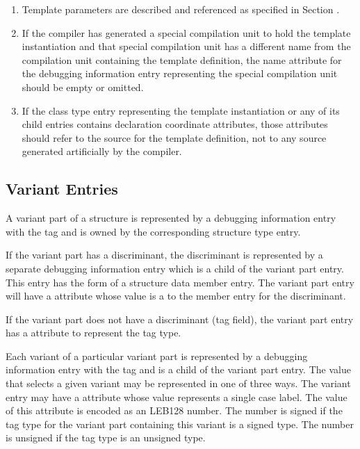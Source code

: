 \begin{enumerate}[1. ]
\item Template parameters are described and referenced as
specified in Section .

\item If the compiler has generated a special compilation unit to
hold the 
template instantiation and that special compilation
unit has a different name from the compilation unit containing
the template definition, the name attribute for the debugging
information entry representing the special compilation unit
should be empty or omitted.

\item If the class type entry representing the template
instantiation or any of its child entries contains declaration
coordinate attributes, those attributes should refer to
the source for the template definition, not to any source
generated artificially by the compiler.
\end{enumerate}


\subsection{Variant Entries}
\label{chap:variantentries}

A variant part of a structure is represented by a debugging
information entry with the 
tag \DWTAGvariantpartTARG{} and is
owned by the corresponding structure type entry.

If the variant part has a discriminant, the discriminant is
\hypertarget{chap:DWATdiscrdiscriminantofvariantpart}{}
represented by a 
separate debugging information entry which
is a child of the variant part entry. This entry has the form
of a 
structure data member entry. The variant part entry will
have a 
\DWATdiscr{} attribute 
whose value is a  to
the member entry for the discriminant.

If the variant part does not have a discriminant (tag field),
the variant part entry has 
a 
\DWATtype{} attribute to represent
the tag type.

Each variant of a particular variant part is represented by
\hypertarget{chap:DWATdiscrvaluediscriminantvalue}{}
a debugging information entry with the 
tag \DWTAGvariantTARG{}
and is a child of the variant part entry. The value that
selects a given variant may be represented in one of three
ways. The variant entry may have a 
\DWATdiscrvalue{} attribute
whose value represents a single case label. The value of this
attribute is encoded as an LEB128 number. The number is signed
if the tag type for the variant part containing this variant
is a signed type. The number is unsigned if the tag type is
an unsigned type.

